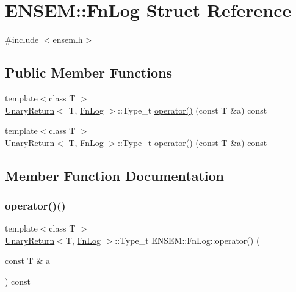 \hypertarget{structENSEM_1_1FnLog}{}\section{E\+N\+S\+EM\+:\+:Fn\+Log Struct Reference}
\label{structENSEM_1_1FnLog}


{\ttfamily \#include $<$ensem.\+h$>$}

\subsection*{Public Member Functions}
\begin{DoxyCompactItemize}
\item 
{\footnotesize template$<$class T $>$ }\\\mbox{\hyperlink{structENSEM_1_1UnaryReturn}{Unary\+Return}}$<$ T, \mbox{\hyperlink{structENSEM_1_1FnLog}{Fn\+Log}} $>$\+::Type\+\_\+t \mbox{\hyperlink{structENSEM_1_1FnLog_a11b3aaca4dd06198708ed986afc66ba7}{operator()}} (const T \&a) const
\item 
{\footnotesize template$<$class T $>$ }\\\mbox{\hyperlink{structENSEM_1_1UnaryReturn}{Unary\+Return}}$<$ T, \mbox{\hyperlink{structENSEM_1_1FnLog}{Fn\+Log}} $>$\+::Type\+\_\+t \mbox{\hyperlink{structENSEM_1_1FnLog_a11b3aaca4dd06198708ed986afc66ba7}{operator()}} (const T \&a) const
\end{DoxyCompactItemize}


\subsection{Member Function Documentation}
\mbox{\label{structENSEM_1_1FnLog_a11b3aaca4dd06198708ed986afc66ba7}} 
\subsubsection{\texorpdfstring{operator()()}{operator()()}\hspace{0.1cm}{\footnotesize\ttfamily [1/2]}}
{\footnotesize\ttfamily template$<$class T $>$ \\
\mbox{\hyperlink{structENSEM_1_1UnaryReturn}{Unary\+Return}}$<$T, \mbox{\hyperlink{structENSEM_1_1FnLog}{Fn\+Log}} $>$\+::Type\+\_\+t E\+N\+S\+E\+M\+::\+Fn\+Log\+::operator() (\begin{DoxyParamCaption}\item[{const T \&}]{a }\end{DoxyParamCaption}) const\hspace{0.3cm}{\ttfamily [inline]}}

